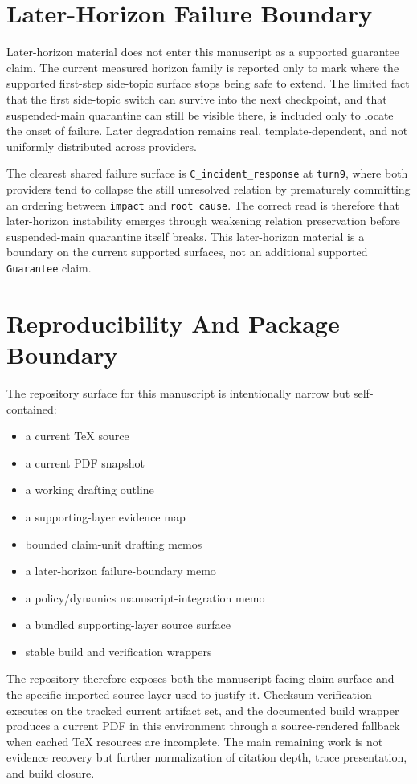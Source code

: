 \documentclass[11pt]{article}
\begin{document}
\section{Later-Horizon Failure Boundary}

Later-horizon material does not enter this manuscript as a supported guarantee
claim. The current measured horizon family is reported only to mark where the
supported first-step side-topic surface stops being safe to extend. The limited
fact that the first side-topic switch can survive into the next checkpoint, and
that suspended-main quarantine can still be visible there, is included only to
locate the onset of failure. Later degradation remains real, template-dependent,
and not uniformly distributed across providers.

The clearest shared failure surface is \texttt{C\_incident\_response} at
\texttt{turn9}, where both providers tend to collapse the still unresolved
relation by prematurely committing an ordering between \texttt{impact} and
\texttt{root cause}. The correct read is therefore that later-horizon
instability emerges through weakening relation preservation before
suspended-main quarantine itself breaks. This later-horizon material is a
boundary on the current supported surfaces, not an additional supported
\texttt{Guarantee} claim.

\section{Reproducibility And Package Boundary}

The repository surface for this manuscript is intentionally narrow but
self-contained:
\begin{itemize}
\item a current TeX source
\item a current PDF snapshot
\item a working drafting outline
\item a supporting-layer evidence map
\item bounded claim-unit drafting memos
\item a later-horizon failure-boundary memo
\item a policy/dynamics manuscript-integration memo
\item a bundled supporting-layer source surface
\item stable build and verification wrappers
\end{itemize}

The repository therefore exposes both the manuscript-facing claim surface and
the specific imported source layer used to justify it. Checksum verification
executes on the tracked current artifact set, and the documented build wrapper
produces a current PDF in this environment through a source-rendered fallback
when cached TeX resources are incomplete. The main remaining work is not
evidence recovery but further normalization of citation depth, trace
presentation, and build closure.
\end{document}
